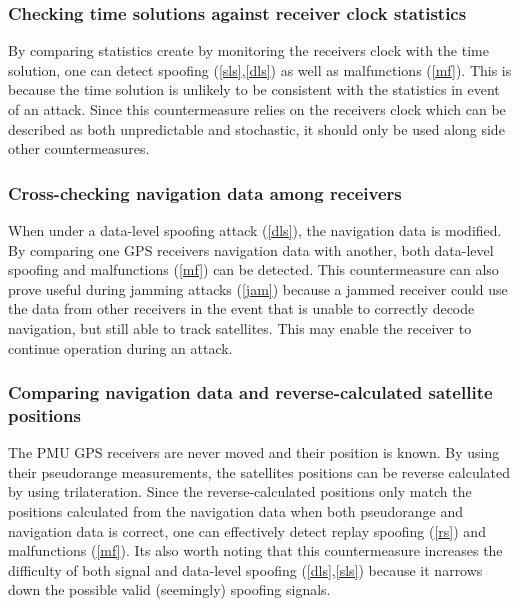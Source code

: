 \documentclass[12pt,english,a4paper]{article}
\begin{document}
\subsubsection{Checking time solutions against receiver clock statistics} %
By comparing statistics create by monitoring the receivers clock with the time solution, one can detect spoofing (\ref{sls},\ref{dls}) as well as malfunctions (\ref{mf}). This is because the time solution is unlikely to be consistent with the statistics in event of an attack. Since this countermeasure relies on the receivers clock which can be described as both unpredictable and stochastic, it should only be used along side other countermeasures.\cite{HengChouGao14}    


\subsubsection{Cross-checking navigation data among receivers} %
When under a data-level spoofing attack (\ref{dls}), the navigation data is modified. By comparing one GPS receivers navigation data with another, both data-level spoofing and malfunctions (\ref{mf}) can be detected. This countermeasure can also prove useful during jamming attacks (\ref{jam}) because a jammed receiver could use the data from other receivers in the event that is unable to correctly decode navigation, but still able to track satellites. This may enable the receiver to continue operation during an attack. \cite{HengChouGao14}  

\subsubsection{Comparing navigation data and reverse-calculated satellite positions} %
The PMU GPS receivers are never moved and their position is known. By using their pseudorange measurements, the satellites positions can be reverse calculated by using trilateration. Since the reverse-calculated positions only match the positions calculated from the navigation data when both pseudorange and navigation data is correct, one can effectively detect replay spoofing (\ref{rs}) and malfunctions (\ref{mf}). Its also worth noting that this countermeasure increases the difficulty of both signal and data-level spoofing (\ref{dls},\ref{sls}) because it narrows down the possible valid (seemingly) spoofing signals. \cite{HengChouGao14} 
\end{document}
